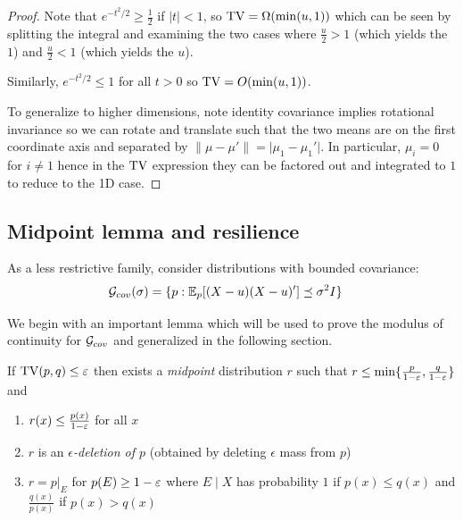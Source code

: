 \begin{proof}
    Note that $e^{-t^2/2} \geq \frac{1}{2}$ if $\lvert t \rvert < 1$, so $\operatorname{TV} = \Omega(\min(u,1))$
    which can be seen by splitting the integral and examining the two cases where
    $\frac{u}{2} > 1$ (which yields the $1$) and $\frac{u}{2} < 1$ (which yields the $u$).
    
    Similarly, $e^{-t^2/2} \leq 1$ for all $t > 0$ so $\operatorname{TV} = O(\min(u,1))$.
    
    To generalize to higher dimensions, note identity covariance implies rotational invariance so we can
    rotate and translate such that the two means are on the first coordinate axis and separated
    by $\|\mu - \mu'\| = \lvert \mu_1 - \mu_1' \rvert$. In particular, $\mu_i = 0$ for $i \neq 1$ hence
    in the $\operatorname{TV}$ expression they can be factored out and integrated to $1$ to reduce to the 1D case.
\end{proof}

\subsection{Midpoint lemma and resilience}

As a less restrictive family, consider distributions with bounded covariance:
\begin{align}
    \mathcal{G}_{cov}(\sigma)
    &= \{ p : \mathbb{E}_p[(X - u)(X - u)'] \preceq \sigma^2 I\}
\end{align}

We begin with an important lemma which will be used to prove the modulus of continuity for $\mathcal{G}_{cov}$
and generalized in the following section.
\begin{lemma}\label{lem:midpoint}
    If $\operatorname{TV}(p,q) \leq \varepsilon$ then exists a \emph{midpoint} distribution $r$ such that
    $r \leq \min\{\frac{p}{1 - \varepsilon}, \frac{q}{1 - \varepsilon}\}$ and
    \begin{enumerate}
        \item $r(x) \leq \frac{p(x)}{1 - \varepsilon}$ for all $x$
        \item $r$ is an \emph{$\epsilon$-deletion of $p$} (obtained by deleting $\epsilon$ mass from $p$)
        \item $r = p \vert_{E}$ for $p(E) \geq 1 - \varepsilon$ where $E \mid X$ has probability $1$ if $p(x) \leq q(x)$ and $\frac{q(x)}{p(x)}$ if $p(x) > q(x)$
    \end{enumerate}
\end{lemma}

